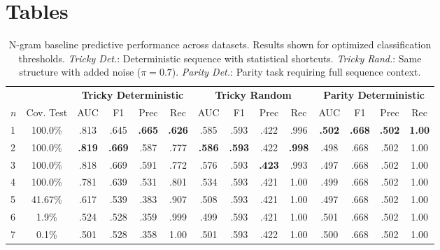 \documentclass{article}
\theoremstyle{plain}
\theoremstyle{definition}
\theoremstyle{remark}
\begin{document}
\newpage

\section{Tables}
\label{appendix:tables}

\begin{table}[h!]
\centering
\caption{N-gram baseline predictive performance across datasets. Results shown for optimized classification thresholds. \textit{Tricky Det.}: Deterministic sequence with statistical shortcuts. \textit{Tricky Rand.}: Same structure with added noise ($\pi=0.7$). \textit{Parity Det.}: Parity task requiring full sequence context.}
\label{tab:ngram_appendix}
\small
\begin{tabular}{lccccc|cccc|cccc}
\toprule
&&   \multicolumn{4}{c}{\textbf{Tricky Deterministic}} & \multicolumn{4}{c}{\textbf{Tricky Random}} & \multicolumn{4}{c}{\textbf{Parity Deterministic}} \\
\cmidrule(lr){3-6} \cmidrule(lr){7-10} \cmidrule(lr){11-14}
$n$ & Cov. Test  & AUC & F1 & Prec & Rec & AUC & F1 & Prec & Rec & AUC & F1 & Prec & Rec \\
\midrule
1 & 100.0\% & .813 & .645 & \textbf{.665} & \textbf{.626} & .585 & .593 & .422 & .996 & \textbf{.502} & \textbf{.668} & \textbf{.502} & \textbf{1.00} \\
2 & 100.0\% &\textbf{.819} & \textbf{.669} & .587 & .777 & \textbf{.586} & \textbf{.593} & .422 & \textbf{.998} & .498 & .668 & .502 & 1.00 \\
3 & 100.0\%  &.818 & .669 & .591 & .772 & .576 & .593 & \textbf{.423} & .993 & .497 & .668 & .502 & 1.00 \\
4 & 100.0\%  &.781 & .639 & .531 & .801 & .534 & .593 & .421 & 1.00 & .499 & .668 & .502 & 1.00 \\
5 & 41.67\% &.617 & .539 & .383 & .907 & .508 & .593 & .421 & 1.00 & .497 & .668 & .502 & 1.00 \\
6 & 1.9\% &.524 & .528 & .359 & .999 & .499 & .593 & .421 & 1.00 & .501 & .668 & .502 & 1.00 \\
7 & 0.1\% &.501 & .528 & .358 & 1.00 & .501 & .593 & .422 & 1.00 & .500 & .668 & .502 & 1.00 \\
\bottomrule
\end{tabular}
\end{table}
\end{document}
